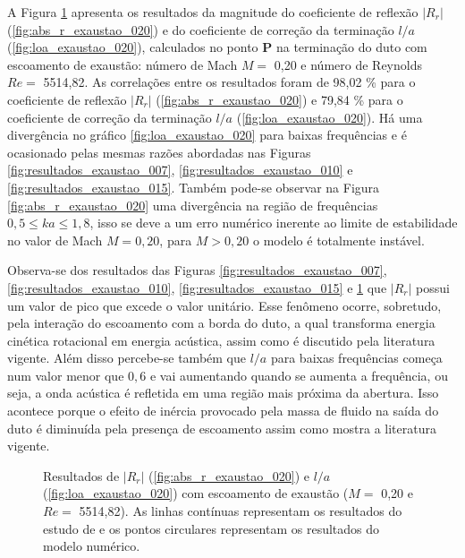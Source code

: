 \newpage
A Figura \ref{fig:resultados_exaustao_020} apresenta os resultados da magnitude do coeficiente de reflexão $|R_{r}|$ (\ref{fig:abs_r_exaustao_020}) e do coeficiente de correção da terminação $l/a$ (\ref{fig:loa_exaustao_020}), calculados no ponto $\textbf{P}$ na terminação do duto com escoamento de exaustão: número de Mach $M =$ 0,20 e número de Reynolds $Re =$ 5514,82.  As correlações entre os resultados foram de 98,02 \% para o coeficiente de reflexão $|R_{r}|$ (\ref{fig:abs_r_exaustao_020}) e 79,84 \% para o coeficiente de correção da terminação $l/a$ (\ref{fig:loa_exaustao_020}). Há uma divergência no gráfico \ref{fig:loa_exaustao_020} para baixas frequências e é ocasionado pelas mesmas razões abordadas nas Figuras \ref{fig:resultados_exaustao_007}, \ref{fig:resultados_exaustao_010} e \ref{fig:resultados_exaustao_015}. Também pode-se observar na Figura \ref{fig:abs_r_exaustao_020} uma divergência na região de frequências $0,5 \leq ka \leq 1,8$, isso se deve a um erro numérico inerente ao limite de estabilidade no valor de Mach $M = 0,20$, para $M > 0,20$ o modelo é totalmente instável.  

Observa-se dos resultados das Figuras \ref{fig:resultados_exaustao_007}, \ref{fig:resultados_exaustao_010}, \ref{fig:resultados_exaustao_015} e \ref{fig:resultados_exaustao_020} que $|R_{r}|$ possui um valor de pico que excede o valor unitário. Esse fenômeno ocorre, sobretudo, pela interação do escoamento com a borda do duto, a qual transforma energia cinética rotacional em energia acústica, assim como é discutido pela literatura vigente. Além disso percebe-se também que $l/a$ para baixas frequências começa num valor menor que $0,6$ e vai aumentando quando se aumenta a frequência, ou seja, a onda acústica é refletida em uma região mais próxima da abertura. Isso acontece porque o efeito de inércia provocado pela massa de fluido na saída do duto é diminuída pela presença de escoamento assim como mostra a literatura vigente.

\begin{figure}[ht!]
\begin{subfigure}{\scaleA \textwidth}
  
\end{subfigure}%
\begin{subfigure}{\scaleA \textwidth}
  
\end{subfigure}
\caption[Resultados de $|R_{r}|$ e $l/a$ com escoamento de exaustão (M $=$ 0,2 e Re $=$ 5514,82)]{Resultados de $|R_{r}|$ (\ref{fig:abs_r_exaustao_020}) e $l/a$ (\ref{fig:loa_exaustao_020}) com escoamento de exaustão ($M =$ 0,20 e $Re =$ 5514,82). As linhas contínuas representam os resultados do estudo de  e os pontos circulares representam os resultados do modelo numérico.}
\label{fig:resultados_exaustao_020}
\end{figure}


